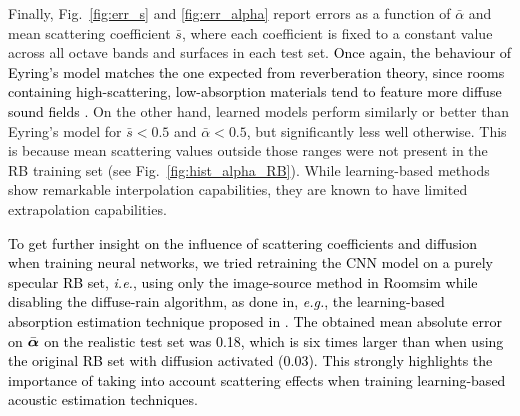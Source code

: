\documentclass[reprint]{JASA}
\def\alphavect{\mbox{\boldmath $\alpha$}}
\begin{document}
Finally, Fig.~\ref{fig:err_s} and \ref{fig:err_alpha} report errors as a function of $\bar{\alpha}$ and mean scattering coefficient $\bar{s}$, where each coefficient is fixed to a constant value across all octave bands and surfaces in each test set. \textcolor{black}{Once again, the behaviour of Eyring's model matches the one expected from reverberation theory, since rooms containing high-scattering, low-absorption materials tend to feature more diffuse sound fields \cite{Hodgson94,Hodgson96}.} On the other hand, learned models perform similarly or better than Eyring's model for $\bar{s}<0.5$ and $\bar{\alpha}<0.5$, but significantly less well otherwise. This is because mean scattering values outside those ranges were not present in the RB training set (see Fig.~\ref{fig:hist_alpha_RB}). While learning-based methods show remarkable interpolation capabilities, they are known to have limited extrapolation capabilities.

\textcolor{black}{To get further insight on the influence of scattering coefficients and diffusion when training neural networks, we tried retraining the CNN model on a purely specular RB set, \textit{i.e.}, using only the image-source method in Roomsim while disabling the diffuse-rain algorithm, as done in, \textit{e.g.}, the learning-based absorption estimation technique  proposed in \cite{yu2020room}. The obtained mean absolute error on $\bar{\alphavect}$ on the realistic test set was 0.18, which is six times larger than when using the original RB set with diffusion activated (0.03). This strongly highlights the importance of taking into account scattering effects when training learning-based acoustic estimation techniques}.


\end{document}
